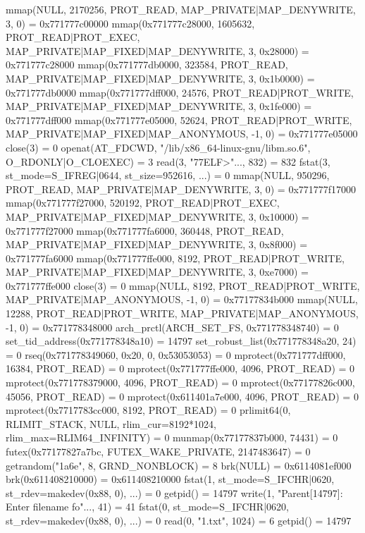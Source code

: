 \begin{breakableverbatim}
mmap(NULL, 2170256, PROT_READ, MAP_PRIVATE|MAP_DENYWRITE, 3, 0) = 0x771777c00000
mmap(0x771777c28000, 1605632, PROT_READ|PROT_EXEC, MAP_PRIVATE|MAP_FIXED|MAP_DENYWRITE, 3, 0x28000) = 0x771777c28000
mmap(0x771777db0000, 323584, PROT_READ, MAP_PRIVATE|MAP_FIXED|MAP_DENYWRITE, 3, 0x1b0000) = 0x771777db0000
mmap(0x771777dff000, 24576, PROT_READ|PROT_WRITE, MAP_PRIVATE|MAP_FIXED|MAP_DENYWRITE, 3, 0x1fe000) = 0x771777dff000
mmap(0x771777e05000, 52624, PROT_READ|PROT_WRITE, MAP_PRIVATE|MAP_FIXED|MAP_ANONYMOUS, -1, 0) = 0x771777e05000
close(3)                                = 0
openat(AT_FDCWD, "/lib/x86_64-linux-gnu/libm.so.6", O_RDONLY|O_CLOEXEC) = 3
read(3, "\177ELF\2\1\1\3\0\0\0\0\0\0\0\0\3\0>\0\1\0\0\0\0\0\0\0\0\0\0\0"..., 832) = 832
fstat(3, {st_mode=S_IFREG|0644, st_size=952616, ...}) = 0
mmap(NULL, 950296, PROT_READ, MAP_PRIVATE|MAP_DENYWRITE, 3, 0) = 0x771777f17000
mmap(0x771777f27000, 520192, PROT_READ|PROT_EXEC, MAP_PRIVATE|MAP_FIXED|MAP_DENYWRITE, 3, 0x10000) = 0x771777f27000
mmap(0x771777fa6000, 360448, PROT_READ, MAP_PRIVATE|MAP_FIXED|MAP_DENYWRITE, 3, 0x8f000) = 0x771777fa6000
mmap(0x771777ffe000, 8192, PROT_READ|PROT_WRITE, MAP_PRIVATE|MAP_FIXED|MAP_DENYWRITE, 3, 0xe7000) = 0x771777ffe000
close(3)                                = 0
mmap(NULL, 8192, PROT_READ|PROT_WRITE, MAP_PRIVATE|MAP_ANONYMOUS, -1, 0) = 0x77177834b000
mmap(NULL, 12288, PROT_READ|PROT_WRITE, MAP_PRIVATE|MAP_ANONYMOUS, -1, 0) = 0x771778348000
arch_prctl(ARCH_SET_FS, 0x771778348740) = 0
set_tid_address(0x771778348a10)         = 14797
set_robust_list(0x771778348a20, 24)     = 0
rseq(0x771778349060, 0x20, 0, 0x53053053) = 0
mprotect(0x771777dff000, 16384, PROT_READ) = 0
mprotect(0x771777ffe000, 4096, PROT_READ) = 0
mprotect(0x771778379000, 4096, PROT_READ) = 0
mprotect(0x77177826c000, 45056, PROT_READ) = 0
mprotect(0x611401a7e000, 4096, PROT_READ) = 0
mprotect(0x7717783cc000, 8192, PROT_READ) = 0
prlimit64(0, RLIMIT_STACK, NULL, {rlim_cur=8192*1024, rlim_max=RLIM64_INFINITY}) = 0
munmap(0x77177837b000, 74431)           = 0
futex(0x77177827a7bc, FUTEX_WAKE_PRIVATE, 2147483647) = 0
getrandom("\x1a\xbd{}\x6e", 8, GRND_NONBLOCK) = 8
brk(NULL)                               = 0x6114081ef000
brk(0x611408210000)                     = 0x611408210000
fstat(1, {st_mode=S_IFCHR|0620, st_rdev=makedev(0x88, 0), ...}) = 0
getpid()                                = 14797
write(1, "Parent[14797]: Enter filename fo"..., 41) = 41
fstat(0, {st_mode=S_IFCHR|0620, st_rdev=makedev(0x88, 0), ...}) = 0
read(0, "1.txt\n", 1024)                = 6
getpid()                                = 14797

\end{breakableverbatim}

